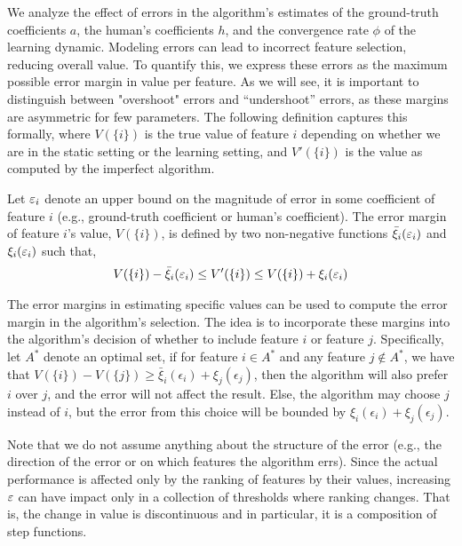 We analyze the effect of errors in the algorithm's estimates of the ground-truth coefficients $a$, the human's coefficients $h$, and the convergence rate $\phi$ of the learning dynamic. Modeling errors can lead to incorrect feature selection, reducing overall value. To quantify this, we express these errors as the maximum possible error margin in value per feature. As we will see, it is important to distinguish between "overshoot" errors and ``undershoot'' errors, as these margins are asymmetric for few parameters. The following definition captures this formally, where $V(\{i\})$ is the
true value of feature $i$ depending on whether we are in the static setting or the learning setting, and $V'(\{i\})$ is the value as computed by the imperfect algorithm.

\begin{definition} \label{def:error-margins-app}
Let $\varepsilon_i$ denote an upper bound on the magnitude of  error in some coefficient of feature $i$ (e.g., ground-truth coefficient or human's coefficient). The error margin of feature $i$'s value, $V(\{i\})$, is defined by two non-negative functions $\bar \xi_i(\varepsilon_i)$ and $\xi_i(\varepsilon_i)$ such that,
\begin{align*}
    V(\{i\})-\bar \xi_i(\varepsilon_i) \leq V'(\{i\})  \leq  V(\{i\}) +\xi_i(\varepsilon_i)
\end{align*}
\end{definition}

The error margins in estimating specific values can be used to compute the error margin in the algorithm's selection. The idea is to incorporate these margins into the algorithm's decision of whether to include feature $i$ or feature $j$. Specifically, let $A^*$ denote an optimal set, if for feature $i \in A^*$ and any feature $j \not \in A^*$, we have that $V(\{i\}) - V(\{j\}) \geq \bar{\xi}_i(\epsilon_i) + \xi_j(\epsilon_j)$, then the algorithm will also prefer $i$ over $j$, and the error will not affect the result. Else, the algorithm may choose $j$ instead of $i$, but the error from this choice will be bounded by $\xi_i(\epsilon_i) + \xi_j(\epsilon_j)$. 

Note that we do not assume anything about the structure of the error (e.g., the direction of the error or on which features the algorithm errs). 
Since the actual performance is affected only by the ranking of features by their values, increasing $\varepsilon$ can have impact only in a collection of thresholds where ranking changes. That is, the change in value is discontinuous and in particular, it is a composition of step functions. %

